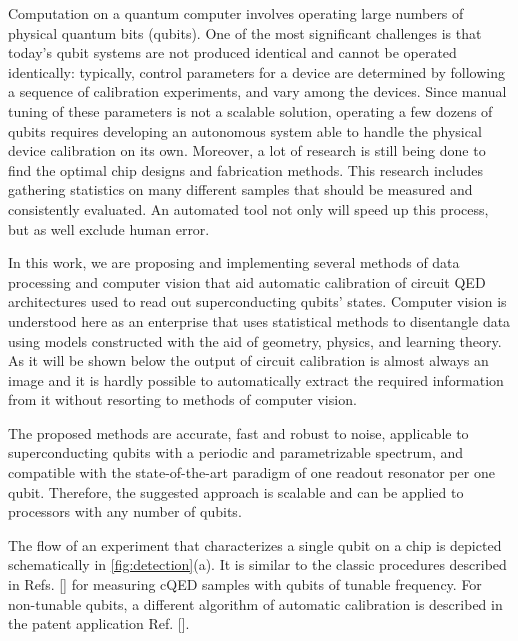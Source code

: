 \documentclass[%
 aip,
 amsmath,amssymb,
 reprint,%
]{revtex4-1}
\begin{document}
Computation on a quantum computer involves operating large numbers of physical quantum bits (qubits). One of the most significant challenges is that today’s qubit systems are not produced identical and cannot be operated identically\cite{kelly2018, chen2018}: typically, control parameters for a device are determined by following a sequence of calibration experiments, and vary among the devices. Since manual tuning of these parameters is not a scalable solution, operating a few dozens of qubits requires developing an autonomous system able to handle the physical device calibration on its own. Moreover, a lot of research is still being done to find the optimal chip designs and fabrication methods. This research includes gathering statistics on many different samples that should be measured and consistently evaluated. An automated tool not only will speed up this process, but as well exclude human error.

In this work, we are proposing and implementing several methods of data processing and computer vision that aid automatic calibration of circuit QED\cite{blais2007} architectures used to read out superconducting qubits' states. Computer vision is understood here as an enterprise that uses statistical methods to disentangle data using models constructed with the aid of geometry, physics, and learning theory\cite{forsyth2011}. As it will be shown below the output of circuit calibration is almost always an image and it is hardly possible to automatically extract the required information from it without resorting to methods of computer vision.

The proposed methods are accurate, fast and robust to noise, applicable to superconducting qubits with a periodic and parametrizable spectrum, and compatible with the state-of-the-art paradigm of one readout resonator per one qubit\cite{versluis2017, kelly2015}. Therefore, the suggested approach is scalable and can be applied to processors with any number of qubits.

The flow of an experiment that characterizes a single qubit on a chip is depicted schematically in \autoref{fig:detection}(a). It is similar to the classic procedures described in Refs. [] for measuring cQED samples with qubits of tunable frequency. For non-tunable qubits, a different algorithm of automatic calibration is described in the patent application Ref. [].
\end{document}
